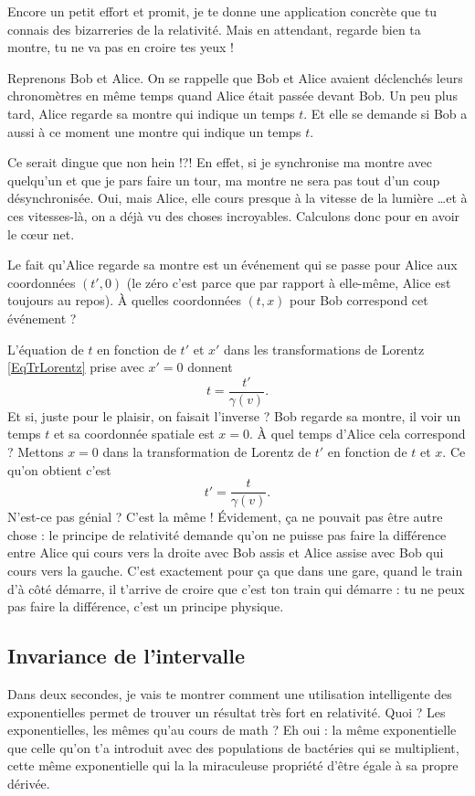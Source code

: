 \documentclass[a4paper,12pt]{book}
\theoremstyle{mes_exemples}	\newtheorem{exemple}[numtho]{Exemple}
\theoremstyle{mes_tho}
\begin{document}
Encore un petit effort et promit, je te donne une application concrète que tu connais des bizarreries de la relativité. Mais en attendant, regarde bien ta montre, tu ne va pas en croire tes yeux !

Reprenons Bob et Alice. On se rappelle que Bob et Alice avaient déclenchés leurs chronomètres en même temps quand Alice était passée devant Bob. Un peu plus tard, Alice regarde sa montre qui indique un temps $t$. Et elle se demande si Bob a aussi à ce moment une montre qui indique un temps $t$.

Ce serait dingue que non hein !?! En effet, si je synchronise ma montre avec quelqu'un et que je pars faire un tour, ma montre ne sera pas tout d'un coup  désynchronisée. Oui, mais Alice, elle cours presque à la vitesse de la lumière \ldots et à ces vitesses-là, on a déjà vu des choses incroyables. Calculons donc pour en avoir le c\oe ur net.

Le fait qu'Alice regarde sa montre est un événement qui se passe pour Alice aux coordonnées $(t',0)$ (le zéro c'est parce que par rapport à elle-même, Alice est toujours au repos). À quelles coordonnées $(t,x)$ pour Bob correspond cet événement ?

L'équation de $t$ en fonction de $t'$ et $x'$ dans les transformations de Lorentz \eqref{EqTrLorentz} prise avec $x'=0$ donnent
\[ 
  t=\frac{ t' }{ \gamma(v) }.
\]
Et si, juste pour le plaisir, on faisait l'inverse ? Bob regarde sa montre, il voir un temps $t$ et sa coordonnée spatiale est $x=0$. À quel temps d'Alice cela correspond ? Mettons $x=0$ dans la transformation de Lorentz de $t'$ en fonction de $t$ et $x$. Ce qu'on obtient c'est
\[ 
  	t'=\frac{ t }{ \gamma(v) }.
\]
N'est-ce pas génial ? C'est la même ! Évidement, ça ne pouvait pas être autre chose : le principe de relativité demande qu'on ne puisse pas faire la différence entre Alice qui cours vers la droite avec Bob assis et Alice assise avec Bob qui cours vers la gauche. C'est exactement pour ça que dans une gare, quand le train d'à côté démarre, il t'arrive de croire que c'est ton train qui démarre : tu ne peux pas faire la différence, c'est un principe physique.


\subsection{Invariance de l'intervalle}

Dans deux secondes, je vais te montrer comment une utilisation intelligente des exponentielles permet de trouver un résultat très fort en relativité. Quoi ? Les exponentielles, les mêmes qu'au cours de math ? Eh oui : la même exponentielle que celle qu'on t'a introduit avec des populations de bactéries qui se multiplient, cette même exponentielle qui la la miraculeuse propriété d'être égale à sa propre dérivée.
\end{document}
